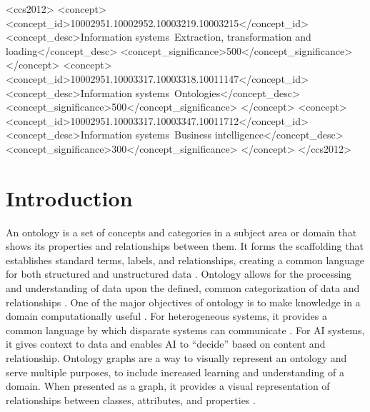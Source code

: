 \documentclass[sigconf]{acmart}
\begin{document}
\begin{CCSXML}
	<ccs2012>
	<concept>
	<concept_id>10002951.10002952.10003219.10003215</concept_id>
	<concept_desc>Information systems~Extraction, transformation and loading</concept_desc>
	<concept_significance>500</concept_significance>
	</concept>
	<concept>
	<concept_id>10002951.10003317.10003318.10011147</concept_id>
	<concept_desc>Information systems~Ontologies</concept_desc>
	<concept_significance>500</concept_significance>
	</concept>
	<concept>
	<concept_id>10002951.10003317.10003347.10011712</concept_id>
	<concept_desc>Information systems~Business intelligence</concept_desc>
	<concept_significance>300</concept_significance>
	</concept>
	</ccs2012>
\end{CCSXML}



\maketitle

\section{Introduction}
An ontology is a set of concepts and categories in a subject area or domain that shows its
properties and relationships between them. It forms the scaffolding that establishes standard
terms, labels, and relationships, creating a common language for both structured and
unstructured data \cite{gruber1993ontology, chari2020explanation}. Ontology allows for the processing and understanding of data
upon the defined, common categorization of data and relationships \cite{yue2023csm}. One of the major objectives
of ontology is to make knowledge in a domain computationally useful \cite{tudorache2020ontology}. For
heterogeneous systems, it provides a common language by which disparate systems can
communicate \cite{fraga2020ontology, yue2023csm}. For AI systems, it gives context to data and enables AI to “decide” based on
content and relationship. Ontology graphs are a way to visually represent an ontology and serve
multiple purposes, to include increased learning and understanding of a domain. When presented
as a graph, it provides a visual representation of relationships between classes, attributes, and
properties \cite{gutierrez2018knowledge, yue2023csm}.
\end{document}
